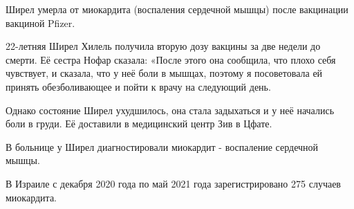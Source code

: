 Ширел умерла от миокардита (воспаления сердечной мышцы) после вакцинации
вакциной Pfizer.

22-летняя Ширел Хилель получила вторую дозу вакцины за две недели до смерти. Её
сестра Нофар сказала: «После этого она сообщила, что плохо себя чувствует, и
сказала, что у неё боли в мышцах, поэтому я посоветовала ей принять
обезболивающее и пойти к врачу на следующий день.

Однако состояние Ширел ухудшилось, она стала задыхаться и у неё начались боли в
груди. Её доставили в медицинский центр Зив в Цфате.

В больнице у Ширел диагностировали миокардит - воспаление сердечной мышцы.

В Израиле с декабря 2020 года по май 2021 года зарегистрировано 275 случаев
миокардита.
